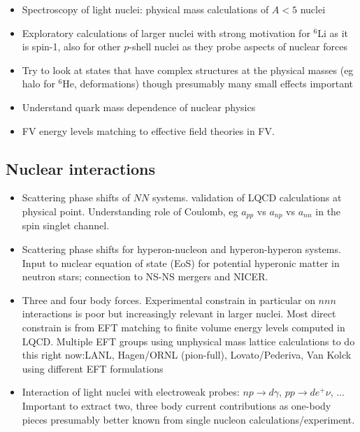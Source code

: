 \begin{itemize}
	\item Spectroscopy of light nuclei: physical mass calculations of $A<5$ nuclei
	
	\item Exploratory calculations of larger nuclei with strong motivation for $^6$Li as it is spin-1, also for other $p$-shell nuclei as they probe aspects of nuclear forces 
	
	\item Try to look at states that have complex structures at the physical masses (eg halo for ${}^6$He, deformations) though presumably many small effects important 
	
	\item Understand quark mass dependence of nuclear physics
	
	\item FV energy levels matching to effective field theories in FV. 
	
\end{itemize}






\subsection{Nuclear interactions}

\begin{itemize}
	\item Scattering  phase shifts of $NN$ systems. validation of LQCD calculations at physical point. Understanding role of Coulomb, eg $a_{pp}$ vs $a_{np}$ vs $a_{nn}$ in the spin singlet channel.
	\item Scattering phase shifts for  hyperon-nucleon and hyperon-hyperon systems. Input to nuclear equation of state (EoS) for potential hyperonic matter in neutron stars; connection to NS-NS mergers and NICER.
	\item Three and four body forces. Experimental constrain in particular on $nnn$ interactions is poor but increasingly relevant in larger nuclei. Most direct constrain is from EFT matching to finite volume energy levels computed in LQCD. Multiple EFT groups using unphysical mass lattice calculations to do this right now:LANL, Hagen/ORNL (pion-full), Lovato/Pederiva, Van Kolck using different EFT formulations
	\item Interaction of light nuclei with electroweak probes: $np\to d\gamma$, $pp\to de^+\nu$, ... 
	Important to extract two, three body current contributions as one-body pieces presumably better known from single nucleon calculations/experiment.
\end{itemize}


